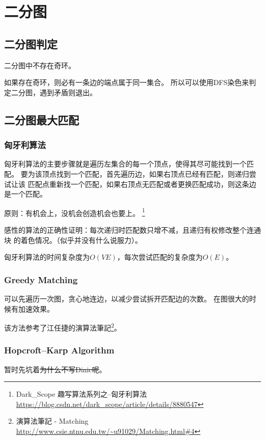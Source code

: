 \section{二分图}
\subsection{二分图判定}
\begin{property}
	二分图中不存在奇环。
\end{property}
如果存在奇环，则必有一条边的端点属于同一集合。
所以可以使用DFS染色来判定二分图，遇到矛盾则退出。



\subsection{二分图最大匹配}

\subsubsection{匈牙利算法}

匈牙利算法的主要步骤就是遍历左集合的每一个顶点，使得其尽可能找到一个匹配。
要为该顶点找到一个匹配，首先遍历边，如果右顶点已经有匹配，则递归尝试让该
匹配点重新找一个匹配，如果右顶点无匹配或者更换匹配成功，则这条边是一个匹配。

原则：有机会上，没机会创造机会也要上。
\footnote{Dark\_Scope 趣写算法系列之--匈牙利算法
	\url{https://blog.csdn.net/dark\_scope/article/details/8880547}}

感性的算法的正确性证明：每次递归时匹配数只增不减，且递归有权修改整个连通块
的着色情况。（似乎并没有什么说服力）。

匈牙利算法的时间复杂度为$O(VE)$，每次尝试匹配的复杂度为$O(E)$。


\subsubsection{Greedy Matching}
可以先遍历一次图，贪心地连边，以减少尝试拆开匹配边的次数。
在图很大的时候有加速效果。

该方法参考了江任捷的演算法筆記\footnote{
    演算法筆記 - Matching
    \url{http://www.csie.ntnu.edu.tw/\~u91029/Matching.html\#4}
}。
\subsubsection{Hopcroft–Karp Algorithm}
暂时先坑着\sout{为什么不写Dinic呢}。

